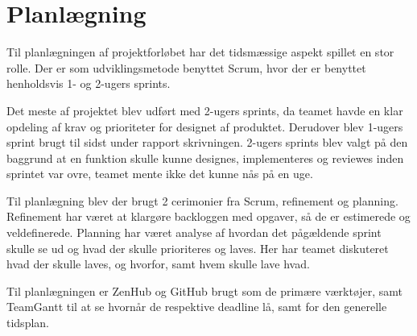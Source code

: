 
\chapter{Planlægning}

Til planlægningen af projektforløbet har det tidsmæssige aspekt spillet en stor rolle. Der er som udviklingsmetode benyttet Scrum, hvor der er benyttet henholdsvis 1- og 2-ugers sprints.

Det meste af projektet blev udført med 2-ugers sprints, da teamet havde en klar opdeling af krav og prioriteter for designet af produktet. Derudover blev 1-ugers sprint brugt til sidst under rapport skrivningen. 2-ugers sprints blev valgt på den baggrund at en funktion skulle kunne designes, implementeres og reviewes inden sprintet var ovre, teamet mente ikke det kunne nås på en uge.

Til planlægning blev der brugt 2 cerimonier fra Scrum, refinement og planning. Refinement har været at klargøre backloggen med opgaver, så de er estimerede og veldefinerede. Planning har været analyse af hvordan det pågældende sprint skulle se ud og hvad der skulle prioriteres og laves. Her har teamet diskuteret hvad der skulle laves, og hvorfor, samt hvem skulle lave hvad.

Til planlægningen er ZenHub og GitHub brugt som de primære værktøjer, samt TeamGantt til at se hvornår de respektive deadline lå, samt for den generelle tidsplan.